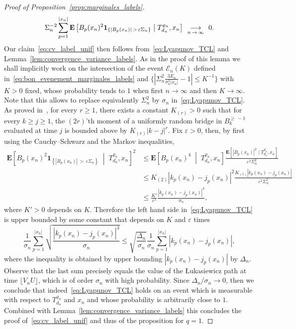 \documentclass[AHL,Unicode,longabstracts,published]{cedram}
\newcommand{\ensembles}[1]{\mathbf{#1}}
\newcommand{\E}{\ensembles{E}}
\newcommand{\Esc}[2]{\E\left[#1 \;\middle|\; #2\right]}
\newcommand{\1}{\ensembles{1}}
\renewcommand{\le}{\leqslant}
\renewcommand{\ge}{\geqslant}
\newcommand{\BBmap}{B}
\newcommand{\clE}{\mathcal{E}}
\newcommand{\fn}{T_{d_n}^{\varrho_n}}
\newcommand{\edges}{E}
\newcommand{\vertices}{V}
\newcommand{\cv}[1][n]{\enskip\mathop{\longrightarrow}^{}_{#1\,\to\,\infty}\enskip}
\begin{document}
\begin{proof}[Proof of Proposition~\ref{prop:marginales_labels}]
\begin{equation}\label{eq:Lyapunov_TCL}
\Sigma_n^{-2} \sum_{p=1}^{|x_n|} \Esc{B_p(x_n)^2 \1_{\left\{\left|B_p(x_n)\right|\,>\,\varepsilon \Sigma_n\right\}}}{\fn, x_n} \cv 0.
\end{equation}
Our claim~\eqref{eq:cv_label_unif} then follows from~\eqref{eq:Lyapunov_TCL} and Lemma~\ref{lem:convergence_variance_labels}. As in the proof of this lemma we shall implicitly work on the intersection of the event $\clE_n(K)$ defined in~\eqref{eq:bon_evenement_marginales_labels} and $\{|\Sigma_n^2 \frac{3 \edges_n}{\sigma_n^2 |x_n|} - 1|\le K^{-1}\}$ with $K>0$ fixed, whose probability tends to $1$ when first $n\to\infty$ and then $K\to\infty$. Note that this allows to replace equivalently $\Sigma^2_n$ by $\sigma_n$ in~\eqref{eq:Lyapunov_TCL}. As proved in~\cite[Lemma~1]{LGM11}, for every $r \ge 1$, there exists a constant $K_{(r)} > 0$ such that for every $k \ge j \ge 1$, the $(2r)$'th moment of a uniformly random bridge in $\BBmap_k^{\ge\,-1}$ evaluated at time $j$ is bounded above by $K_{(r)} |k-j|^r$. Fix $\varepsilon > 0$, then, by first using the Cauchy--Schwarz and the Markov inequalities,
\begin{align*}
\Esc{B_p(x_n)^2 \1_{\left\{\left|B_p(x_n)\right|\,>\, \varepsilon \Sigma_n\right\}}}{\fn, x_n}^2 &\le \Esc{B_p(x_n)^4}{\fn, x_n} \frac{\E\left[\left|B_p(x_n)\right|^2 \mid \fn, x_n\right]}{\varepsilon^2 \Sigma_n^2}
\\
&\le K_{(2)} \left|k_p(x_n)-j_p(x_n)\right|^2 \frac{K_{(1)} \left|k_p(x_n)-j_p(x_n)\right|}{\varepsilon^2 \Sigma_n^2}
\\
&\le \frac{K'}{\varepsilon^2} \frac{\left|k_p(x_n)-j_p(x_n)\right|^3}{\sigma_n},
\end{align*}
where $K' > 0$ depends on $K$. Therefore the left hand side in~\eqref{eq:Lyapunov_TCL} is upper bounded by some constant that depends on $K$ and $\varepsilon$ times
\[
\frac{1}{\sigma_n} \sum_{p=1}^{|x_n|} \sqrt{\frac{\left|k_p(x_n)-j_p(x_n)\right|^3}{\sigma_n}}
\le \sqrt{\frac{\Delta_n}{\sigma_n}} \frac{1}{\sigma_n} \sum_{p=1}^{|x_n|} \left|k_p(x_n)-j_p(x_n)\right|,
\]
where the inequality is obtained by upper bounding $|k_p(x_n)-j_p(x_n)|$ by $\Delta_n$. Observe that the last sum precisely equals the value of the {\L}ukasiewicz path at time $\lfloor \vertices_n U \rfloor$, which is of order $\sigma_n$ with high probability. Since $\Delta_n/\sigma_n \to 0$, then we conclude that indeed~\eqref{eq:Lyapunov_TCL} holds on an event which is measurable with respect to $\fn$ and $x_n$ and whose probability is arbitrarily close to $1$. Combined with Lemma~\ref{lem:convergence_variance_labels} this concludes the proof of~\eqref{eq:cv_label_unif} and thus of the proposition for $q=1$.



\end{proof}
\end{document}
